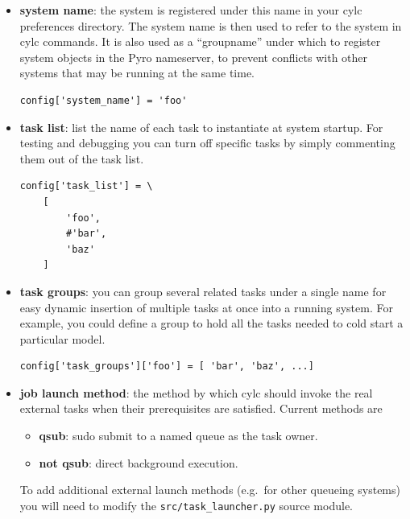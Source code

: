 \documentclass[11pt,a4paper]{article}
\begin{document}
\begin{itemize} \item {\bf system name}: the system is registered under
        this name in your cylc preferences directory. The system name is
        then used to refer to the system in cylc commands. It is also
        used as a ``groupname'' under which to register system objects 
        in the Pyro nameserver, to prevent conflicts with other systems
        that may be running at the same time.

        \begin{lstlisting}
config['system_name'] = 'foo'
        \end{lstlisting}

    \item {\bf task list}: list the name of each task to instantiate at
        system startup.  For testing and debugging you can turn off
        specific tasks by simply commenting them out of the task list.
        
        \begin{lstlisting}
config['task_list'] = \
    [
        'foo',
        #'bar',
        'baz'
    ]
        \end{lstlisting}


    \item {\bf task groups}: you can group several related tasks under a
        single name for easy dynamic insertion of multiple tasks at
        once into a running system. For example, you could define a 
        group to hold all the tasks needed to cold start a particular
        model.

        \begin{lstlisting}
config['task_groups']['foo'] = [ 'bar', 'baz', ...]
        \end{lstlisting}

    \item {\bf job launch method}: the method by which cylc should
        invoke the real external tasks when their prerequisites are
        satisfied. Current methods are
        \begin{itemize}
            \item {\bf qsub}: sudo submit to a named queue as the task
                owner.  
            \item {\bf not qsub}: direct background execution.
        \end{itemize}
        To add additional external launch methods (e.g.\ for other
        queueing systems) you will need to modify the 
        \lstinline{src/task_launcher.py} source module.


\end{itemize}
\end{document}
